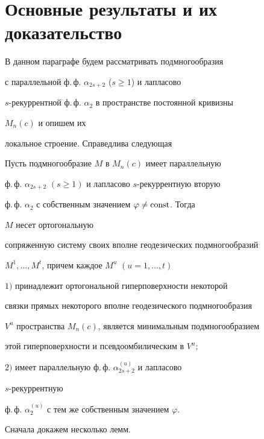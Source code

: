 \section{Основные результаты и их доказательство}





В данном параграфе будем рассматривать подмногообразия


с параллельной ф.\,ф. $\alpha_{2s+2}$ ($s\ge 1$) и лапласово


$s$-рекуррентной ф.\,ф. $\alpha_2$ в пространстве постоянной кривизны


$M_n(c)$ и опишем их


локальное строение. Справедлива следующая





\begin{thm} Пусть подмногообразие $M$ в $M_n(c)$ имеет параллельную


ф.\,ф. $\alpha_{2s+2}$ $(s\ge 1)$ и лапласово $s$-рекуррентную вторую


ф.\,ф. $\alpha_2$ с собственным значением $\varphi\ne\operatorname{const}$. Тогда


$M$ несет ортогональную


сопряженную систему своих вполне геодезических подмногообразий


$M^1,\dotsc,M^t$, причем каждое $M^u$ $(u=1,\dotsc,t)$





$1)$ принадлежит ортогональной гиперповерхности некоторой


связки прямых некоторого вполне геодезического подмногообразия


$V^u$ пространства $M_n(c)$, является минимальным подмногообразием


этой гиперповерхности и псевдоомбилическим в $V^u;$





$2)$ имеет параллельную ф.\,ф. $\alpha^{(u)}_{2s+2}$ и лапласово


$s$-рекуррентную


ф.\,ф. $\alpha^{(u)}_2$ с тем же собственным значением $\varphi$.


\end{thm}





Сначала докажем несколько лемм.





